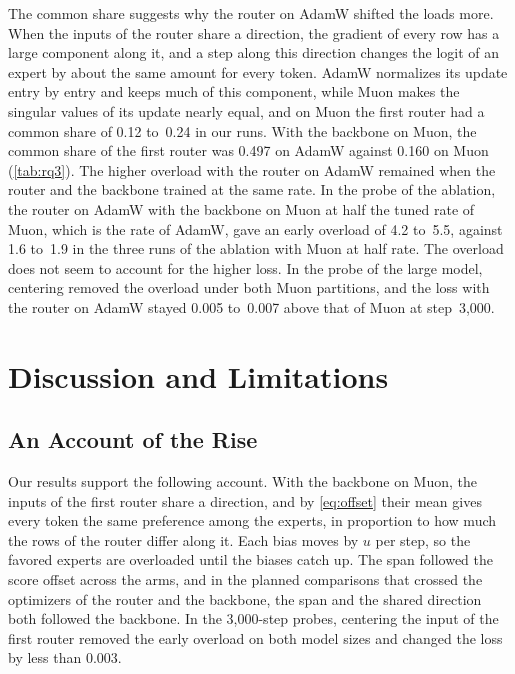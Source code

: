 \documentclass[11pt, a4paper]{article}
\begin{document}
The common share suggests why the router on AdamW shifted the loads more. When the inputs of the router share a direction, the gradient of every row has a large component along it, and a step along this direction changes the logit of an expert by about the same amount for every token. AdamW normalizes its update entry by entry and keeps much of this component, while Muon makes the singular values of its update nearly equal, and on Muon the first router had a common share of 0.12 to~0.24 in our runs. With the backbone on Muon, the common share of the first router was 0.497 on AdamW against 0.160 on Muon (\cref{tab:rq3}). The higher overload with the router on AdamW remained when the router and the backbone trained at the same rate. In the probe of the ablation, the router on AdamW with the backbone on Muon at half the tuned rate of Muon, which is the rate of AdamW, gave an early overload of 4.2 to~5.5, against 1.6 to~1.9 in the three runs of the ablation with Muon at half rate. The overload does not seem to account for the higher loss. In the probe of the large model, centering removed the overload under both Muon partitions, and the loss with the router on AdamW stayed 0.005 to~0.007 above that of Muon at step~3,000.

\section{Discussion and Limitations}
\label{sec:discussion}

\subsection{An Account of the Rise}
\label{sec:mechanism}

Our results support the following account. With the backbone on Muon, the inputs of the first router share a direction, and by \cref{eq:offset} their mean gives every token the same preference among the experts, in proportion to how much the rows of the router differ along it. Each bias moves by $u$ per step, so the favored experts are overloaded until the biases catch up. The span followed the score offset across the arms, and in the planned comparisons that crossed the optimizers of the router and the backbone, the span and the shared direction both followed the backbone. In the 3,000-step probes, centering the input of the first router removed the early overload on both model sizes and changed the loss by less than 0.003.
\end{document}
